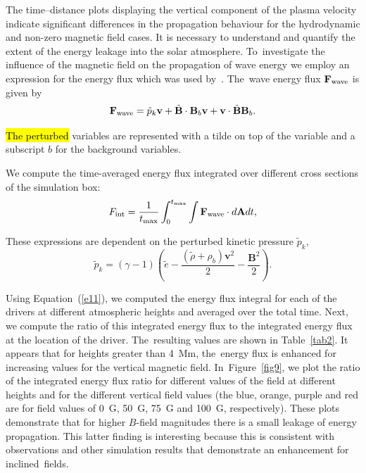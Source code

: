 \documentclass[physics,article,accept,pdftex,moreauthors]{Definitions/mdpi}
\begin{document}
The time--distance plots displaying the vertical component of the plasma velocity indicate significant differences in the propagation 
behaviour for the hydrodynamic and non-zero magnetic field cases. It is necessary to understand and quantify the extent of the energy 
leakage into the solar atmosphere. To~investigate the influence of the magnetic field on the propagation of wave energy we employ an 
expression for the energy flux which was used by~\cite{Bogdan2003}. The~wave energy flux 
 {${\bf F}_{\rm wave}$} %
 is given by
$$
{\mathbf F}_{\rm wave}=\tilde{p}_{k} {\mathbf v}+\tilde{\mathbf B}\cdot {\mathbf B_{b}}{\mathbf v}+{\mathbf v}\cdot \tilde{\mathbf 
B}{\mathbf B_{b}} .
$$

\hl{The perturbed} variables are represented with a tilde  on top of the variable and a subscript $b$ for the background variables. 

We compute the {time-averaged} %
energy flux integrated over different cross sections of the simulation {box:} %
\begin{equation}
F_{\rm int}= \frac{1}{t_{\rm max}} \int_{0}^{t_{\rm max}} \int {\mathbf F}_{\rm wave} \cdot d{\mathbf A}dt,
\label{e11}
\end{equation}

These expressions are dependent on the perturbed kinetic pressure $\tilde{p}_{k}$, 
$$
\tilde{p}_{k}=\left(\gamma - 1\right)\left( \tilde{e}-\frac{ \left( \tilde{\rho} +\rho_b \right){\mathbf v}^2}{2}-\frac{{\mathbf B}^2}{2}\right).
$$


Using Equation~(\ref{e11}), we computed the energy flux integral for each of the drivers at different atmospheric heights and averaged over the total time. Next, we compute the ratio of this integrated energy flux to the integrated energy flux at the location of the driver. The~resulting values are shown in Table~\ref{tab2}. It appears that for heights greater than 4~Mm, the~energy flux is enhanced for increasing values for the vertical magnetic field. In~Figure~\ref{fig9},
we plot the ratio of the integrated energy flux ratio for different values of the field at different heights and for the different vertical field values (the blue, orange, purple and red  are for field values of 0~G, 50~G, 75~G and 100~G, respectively). These plots demonstrate that for higher $B$-field magnitudes there is a small leakage of energy propagation. This latter finding is interesting because this is consistent with observations and other simulation results that demonstrate an enhancement for inclined~fields.
\end{document}
